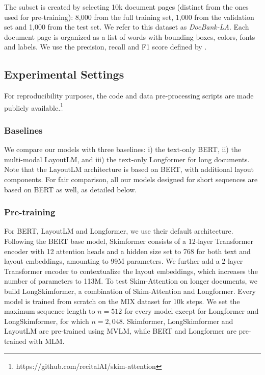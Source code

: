 The subset is created by selecting 10k document pages (distinct from the ones used for pre-training): 8,000 from the full training set, 1,000 from the validation set and 1,000 from the test set. We refer to this dataset as \textit{DocBank-LA}. Each document page is organized as a list of words with bounding boxes, colors, fonts and labels. We use the precision, recall and F1 score defined by \citet{li2020docbank}.

\subsection{Experimental Settings}

For reproducibility purposes, the code and data pre-processing scripts are made publicly available.\footnote{https://github.com/recitalAI/skim-attention}

\subsubsection{Baselines}

We compare our models with three baselines: i) the text-only \ac{BERT}, ii) the multi-modal LayoutLM, and iii) the text-only Longformer for long documents. Note that the LayoutLM architecture is based on \ac{BERT}, with additional layout components. For fair comparison, all our models designed for short sequences are based on \ac{BERT} as well, as detailed below.

\subsubsection{Pre-training}

For \ac{BERT}, LayoutLM and Longformer, we use their default architecture. Following the \ac{BERT} base model, Skimformer consists of a 12-layer Transformer encoder with 12 attention heads and a hidden size set to 768 for both text and layout embeddings, amounting to 99M parameters. We further add a 2-layer Transformer encoder to contextualize the layout embeddings, which increases the number of parameters to 113M. To test Skim-Attention on longer documents, we build LongSkimformer, a combination of Skim-Attention and Longformer. Every model is trained from scratch on the MIX dataset for 10k steps. We set the maximum sequence length to $n = 512$ for every model except for Longformer and LongSkimformer, for which $n = 2,048$. Skimformer, LongSkimformer and LayoutLM are pre-trained using MVLM, while \ac{BERT} and Longformer are pre-trained with MLM.

